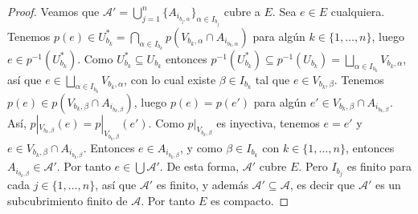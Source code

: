 \begin{proof}
   Veamos que $\mathcal{A}'=\bigcup_{j=1}^{n}\{A_{i_{b_j,\alpha}}\}_{\alpha\in I_{b_j}}$ cubre a $E$. Sea $e\in E$ cualquiera. Tenemos $p(e)\in U_{b_k}^*=\bigcap_{\alpha\in I_{b_k}}p(V_{b_k,\alpha}\cap A_{i_{b_k,\alpha}})$ para algún $k\in\{1,\dots,n\}$, luego $e\in p^{-1}(U_{b_k}^*)$. Como $U^*_{b_k}\subseteq U_{b_k}$ entonces $p^{-1}\left( U^*_{b_k}\right)\subseteq p^{-1}\left( U_{b_k}\right)=\bigsqcup _{\alpha\in I_{b_k}}V_{b_k,\alpha}$, así que $e\in \bigsqcup _{\alpha\in{I_{b_k}}}V_{b_k,\alpha}$, con lo cual existe $\beta\in I_{b_k}$ tal que $e\in V_{b_k,\beta}$. Tenemos $p(e)\in p(V_{b_k,\beta}\cap A_{i_{b_k,\beta}})$, luego $p(e)=p(e')$ para algún $e'\in V_{b_k,\beta}\cap A_{i_{b_k,\beta}}$. Así, $p|_{V_{b_k,\beta}}(e)=p|_{V_{b_k,\beta}}(e')$. Como $p|_{V_{b_k,\beta}}$ es inyectiva, tenemos $e=e'$ y $e\in V_{b_k,\beta}\cap A_{i_{b_k,\beta}}$. Entonces $e\in A_{i_{b_k,\beta}}$, y como $\beta\in I_{b_k}$ con $k\in\{1,\dots,n\}$, entonces $A_{i_{b_k,\beta}}\in\mathcal{A}'$. Por tanto $e\in\bigcup\mathcal{A}'$. De esta forma, $\mathcal{A}'$ cubre $E$. Pero $I_{b_j}$ es finito para cada $j\in\{1,\dots,n\}$, así que $\mathcal{A}'$ es finito, y además $\mathcal{A}'\subseteq\mathcal{A}$, es decir que $\mathcal{A}'$ es un subcubrimiento finito de $\mathcal{A}$. Por tanto $E$ es compacto.
\end{proof}\clearpage
